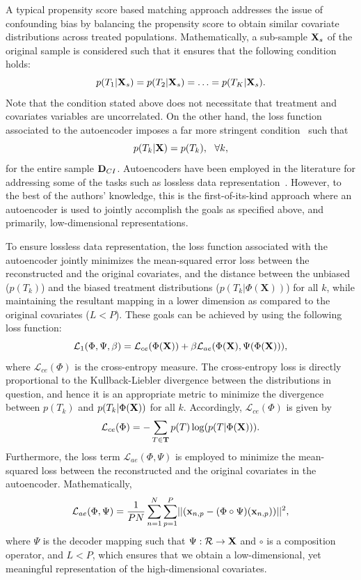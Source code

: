 \documentclass[twoside,11pt]{article}
\begin{document}
A typical propensity score based matching approach addresses the issue of confounding bias by balancing the propensity score to obtain similar covariate distributions across treated populations. Mathematically, a sub-sample $\mathbf{X}_s$ of the original sample is considered such that it ensures that the following condition holds:
\begin{equation}
    p(T_1|\mathbf{X}_s) = p(T_2|\mathbf{X}_s) = \hdots = p(T_K|\mathbf{X}_s).
\end{equation}
Note that the condition stated above does not necessitate that treatment and covariates variables are uncorrelated. On the other hand, the loss function associated to the autoencoder imposes a far more stringent condition~\citep{atan2018deep} such that
\begin{equation}
    p(T_k|\mathbf{X}) = p(T_k),~~ \forall k,
\end{equation}
for the entire sample $\mathbf{D}_{CI}$. Autoencoders have been employed in the literature for addressing some of the tasks such as lossless data representation~\citep{atan2018deep,ramachandra2018deep}. However, to the best of the authors' knowledge, this is the first-of-its-kind approach where an autoencoder is used to jointly accomplish the goals as specified above, and primarily, low-dimensional representations. 

To ensure lossless data representation, the loss function associated with the autoencoder jointly minimizes the mean-squared error loss between the reconstructed and the original covariates, and the distance between the unbiased ($p(T_k)$) and the biased treatment distributions ($p(T_k|\Phi(\mathbf{X}))$) for all $k$, while maintaining the resultant mapping in a lower dimension as compared to the original covariates ($L < P$). These goals can be achieved by using the following loss function:
\begin{equation}
    \mathcal{L}_1(\Phi,\Psi,\beta) = \mathcal{L}_{ce}(\Phi(\mathbf{X})) + \beta \mathcal{L}_{ae}(\Phi(\mathbf{X}),\Psi(\Phi(\mathbf{X}))),
\end{equation}
where $\mathcal{L}_{ce}(\Phi)$ is the cross-entropy measure. The cross-entropy loss is directly proportional to the Kullback-Liebler divergence between the distributions in question, and hence it is an appropriate metric to minimize the divergence between $p(T_k)$ and $p(T_k|\Phi(\mathbf{X}))$ for all $k$. Accordingly, $\mathcal{L}_{ce}(\Phi)$ is given by
\begin{equation}
    \mathcal{L}_{ce}(\Phi)  = -\sum_{T \in \mathbf{T}} p(T)\log(p(T|\Phi(\mathbf{X}))).
\end{equation}
Furthermore, the loss term $\mathcal{L}_{ae}(\Phi,\Psi)$ is employed to minimize the mean-squared loss between the reconstructed and the original covariates in the autoencoder. Mathematically, 
\begin{equation}
    \mathcal{L}_{ae}(\Phi,\Psi) = \frac{1}{PN}\sum_{n = 1}^N\sum_{p = 1}^P\lvert\lvert(\mathbf{x}_{n,p} - (\Phi\circ\Psi)(\mathbf{x}_{n,p}))\rvert\rvert^2,
\end{equation}
where $\Psi$ is the decoder mapping such that $\Psi: \mathcal{R} \rightarrow \mathbf{X}$ and $\circ$ is a composition operator, and $L < P$, which ensures that we obtain a low-dimensional, yet meaningful representation of the high-dimensional covariates. 
\end{document}
